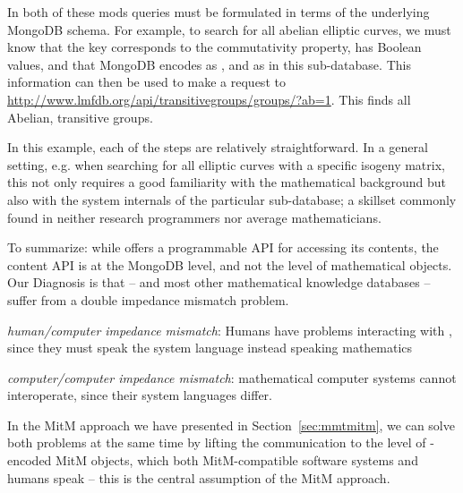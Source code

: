 In both of these mods queries must be formulated in terms of the underlying MongoDB
schema. For example, to search for all abelian elliptic curves, we must know that the
 key corresponds to the commutativity property, has Boolean values, and
that MongoDB encodes  as , and  as
 in this \lmfdb sub-database. This information can then be used to make a
request to \url{http://www.lmfdb.org/api/transitivegroups/groups/?ab=1}. This finds all
Abelian, transitive groups.

In this example, each of the steps are relatively straightforward. 
In a general setting, e.g. when searching for all elliptic curves with a specific isogeny
matrix, this not only requires a good familiarity with the mathematical background but
also with the system internals of the particular \lmfdb sub-database; a skillset commonly
found in neither research programmers nor average mathematicians.   

To summarize: while \lmfdb offers a programmable API for accessing its contents, the
content API is at the MongoDB level, and not the level of mathematical objects. Our
Diagnosis is that \lmfdb -- and most other mathematical knowledge databases -- suffer from
a double impedance mismatch problem.
\begin{compactenum}[\bf {I}1]
\item \emph{human/computer impedance mismatch}: Humans have problems interacting with
  \lmfdb, since they must speak the system language instead \lmfdb speaking mathematics
\item \emph{computer/computer impedance mismatch}: mathematical computer systems cannot
  interoperate, since their system languages differ.
\end{compactenum}
In the MitM approach we have presented in Section~\ref{sec:mmtmitm}, we can solve both
problems at the same time by lifting the communication to the level of \ommt-encoded MitM
objects, which both MitM-compatible software systems and humans speak -- this is the
central assumption of the MitM approach.

